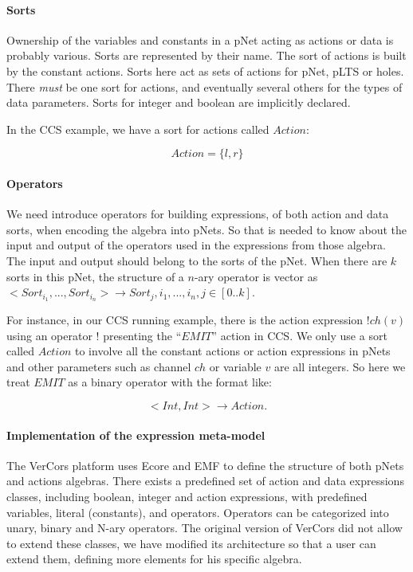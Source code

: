\documentclass{lncs/llncs}
\newcommand{\QIN}[1]{\textcolor{airforceblue}{#1}}
\begin{document}
\paragraph{Sorts}
Ownership of the variables and constants in a pNet acting as actions
or data is probably various. Sorts are represented by their name. The
sort of actions is built by the constant actions. Sorts here act as
sets of actions for pNet, pLTS or 
holes. There \emph{must} be one sort for actions, and eventually
several others for the types of data parameters. Sorts for integer
and boolean are implicitly declared. 

\QIN{
In the CCS example, we have a sort for actions called $Action$:
}

\[ Action = \{ l, r\} \]

\paragraph{Operators}
We need introduce operators for building expressions, of both action
and data sorts, when encoding the 
algebra into pNets. So that is needed to know about the input and
output of the operators used in the expressions from those
algebra. The input and output should belong to the sorts of the
pNet. When there are $k$ sorts in this pNet, the structure of a
$n$-ary operator is vector as $< Sort_{i_1}, ... , Sort_{i_n} >
\rightarrow Sort_j , i_1 , ... , i_n, j \in [0..k] $.

\QIN{For instance, in our CCS running example, there is the action expression $!ch(v)$ using an operator $!$ presenting the ``$EMIT$'' action in CCS. We only use a sort called $Action$ to involve all the constant actions or action expressions in pNets and other parameters such as channel $ch$ or variable $v$ are all integers. So here we treat $EMIT$ as a binary operator with the format like:
}

 \[ < Int, Int > \rightarrow Action . \]

\paragraph{Implementation of the expression meta-model}
The VerCors platform uses Ecore and EMF to define the structure of
both pNets and actions algebras. There exists a predefined set of
action and data expressions classes, including boolean, integer and
action expressions, with predefined variables, literal (constants),
and operators. Operators can be categorized into unary, binary and
N-ary operators.
The original version of VerCors did not allow to extend these classes,
we have modified its architecture so that a user can extend them,
defining more elements for his specific algebra.
\end{document}
